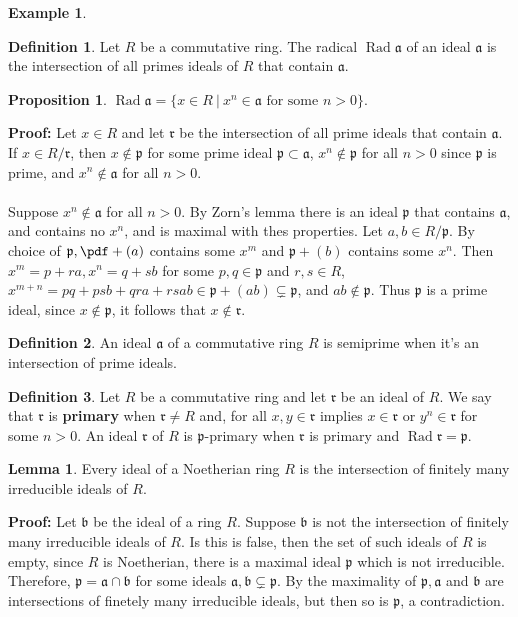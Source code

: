 \documentclass[11pt]{amsbook}%
\theoremstyle{plain}
\theoremstyle{definition}
\newtheorem{definition*}{Definition}
\newtheorem*{example*}{Example}
\newtheorem{lemma}{Lemma}
\newtheorem{proposition}[theorem]{Proposition}
\numberwithin{equation}{section}
\newcommand{\af}{\mathfrak a}
\newcommand{\bff}{\mathfrak b}
\newcommand{\rf}{\mathfrak r}
\newcommand{\pf}{\mathfrak p}
\renewcommand{\proof}{ \textbf{Proof: }}
\DeclareMathOperator{\Rad}{Rad}
\begin{document}
\begin{example*}
\begin{definition*}
  \label{def-radical}
  Let $R$ be a commutative ring. The radical $\Rad \af$ of an ideal $\af$ is the intersection
  of all primes ideals of $R$ that contain $\af$.
\end{definition*}

\begin{proposition}
  $\Rad \af = \{x \in R \ | \ x^{n} \in \af \text{ for some } n > 0 \}$.
\end{proposition} \vspace{1.8em}
\proof Let $x \in R$ and let $\rf$ be the intersection of all prime ideals that contain
$\af$. If $x \in R/\rf$, then $x \notin \pf$ for some prime ideal $\pf \subset \af$,
$x^{n} \notin \pf$ for all $n > 0$ since $\pf$ is prime, and $x^{n} \notin \af$ for all $n > 0$. \\ \\
Suppose $x^{n} \notin \af$ for all $n > 0$. By Zorn's lemma there is an ideal $\pf$
that contains $\af$, and contains no $x^{n}$, and is maximal with thes properties.
Let $a, b \in R/\pf$. By choice of $\pf, \pdf + (a)$ contains some $x^{m}$ and
$\pf + (b)$ contains some $x^{n}$. Then $x^{m} = p + ra, x^{n} = q + sb$ for some
$p, q \in \pf$ and $r, s \in R$, $x^{m+n} = pq + psb + qra + rsab \in \pf + (ab) \subsetneq \pf$, and
$ab \notin \pf$. Thus $\pf$ is a prime ideal, since $x \notin \pf$, it follows that $x \notin \rf$. \qedsymbol

\begin{definition*}
  \label{def-semiprime}
  An ideal $\af$ of a commutative ring $R$ is semiprime when it's an intersection of prime ideals.
\end{definition*}

\begin{definition*}
  \label{def-ideal-primary}
  Let $R$ be a commutative ring and let $\rf$ be an ideal of $R$. We say that $\rf$ is \textbf{primary}
  when $\rf \neq R$ and, for all $x, y \in \rf$ implies $x \in \rf$ or $y^{n} \in \rf$
  for some $n > 0$. An ideal $\rf$ of $R$ is $\pf$-primary when $\rf$ is primary and
  $\Rad \rf = \pf$.
\end{definition*}

\begin{lemma}
  \label{lemm-ideal-noetherian}
  Every ideal of a Noetherian ring $R$ is the intersection of finitely many irreducible ideals of $R$.
\end{lemma} \vspace{1.8em}
\proof Let $\bff$ be the ideal of a ring $R$. Suppose $\bff$ is not the intersection
of finitely many irreducible ideals of $R$. Is this is false, then the set of such ideals of $R$
is empty, since $R$ is Noetherian, there is a maximal ideal $\pf$ which is not irreducible.
Therefore, $\pf = \af \cap \bff$ for some ideals $\af, \bff \subsetneq \pf$. By the maximality
of $\pf, \af$ and $\bff$ are intersections of finetely many irreducible ideals, but then so is $\pf$,
a contradiction. \qedsymbol


\end{example*}
\end{document}
